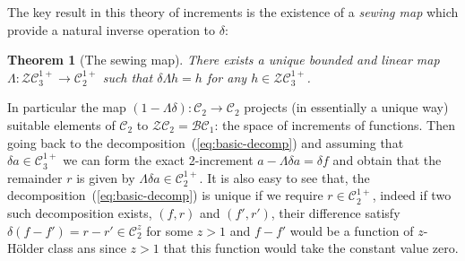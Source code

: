 \documentclass[a4paper]{article}
\newcommand{\1}{{\bf 1}}
\newcommand{\der}{\delta}
\newcommand{\CC}{\mathcal{C}}
\newcommand{\BB}{\mathcal{B}}
\newcommand{\ZZ}{\mathcal{Z}}
\newtheorem{theorem}{Theorem}[section]
\newcommand{\ZCC}{\ZZ\CC}
\newcommand{\BCC}{\BB\CC}
\newcommand{\CC}{\mathcal{C}}
\newcommand{\der}{\delta}
\begin{document}
\bigskip

The key result in this theory of increments is the existence of a \emph{sewing map} which provide a natural inverse operation to $\der$:

\begin{theorem}[The sewing map] There exists a unique bounded and linear
  map $\Lambda : \ZCC_3^{1+} \to \CC^{1+}_2$ such that $\der \Lambda h = h$ for any $h \in \ZCC_3^{1+}$.
\end{theorem}

In particular the map $(1-\Lambda \der) : \CC_2 \to \CC_2 $ projects
(in essentially a unique way)
suitable elements of $\CC_2$ to $\ZCC_2 = \BCC_1$: the space of
increments of functions.
Then going back to the decomposition~(\ref{eq:basic-decomp}) and
assuming that  $\der a\in \CC_3^{1+} $ we can form the exact 2-increment
$a - \Lambda \der a = \der f$ and obtain that the remainder $r$ is
given by $\Lambda \der a \in \CC_2^{1+}$. It is also easy to
see that, the decomposition~(\ref{eq:basic-decomp}) is unique if we
require $r \in \CC_2^{1+}$, indeed if two such decomposition
exists, $(f,r)$ and $(f',r')$, their difference satisfy $\der(f-f')=r-r'
\in \CC_2^z$ for some $z > 1$ and $f-f'$ would be a function of
$z$-H\"older class ans since $z>1$ that this function would take the
constant value zero.
\end{document}
